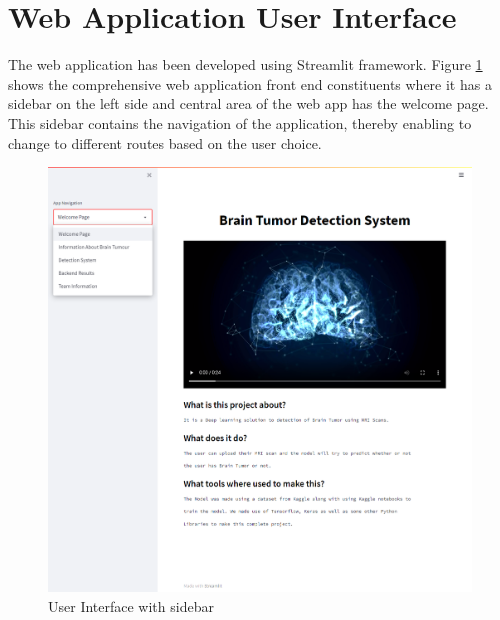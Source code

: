 \section{Web Application User Interface}
The web application has been developed using Streamlit framework. Figure \ref{fig:UI_sidebar} shows the comprehensive web application front end constituents where it has a sidebar on the left side and central area of the web app has the welcome page. This sidebar contains the navigation of the application, thereby enabling to change to different routes based on the user choice.

\begin{figure}[H]
\includegraphics[scale=0.3]{Photos/UI_with_sidebar.png}
\caption{User Interface with sidebar} \label{fig:UI_sidebar}
\end{figure}

